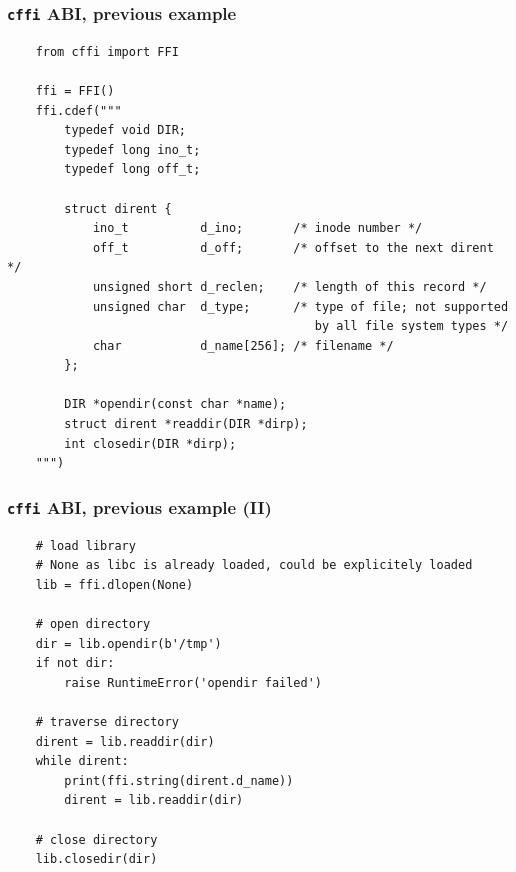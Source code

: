 \documentclass[handout]{beamer}
\begin{document}
\begin{frame}[fragile]
  \frametitle{\texttt{cffi} ABI, previous example}

  \begin{verbatim}
    from cffi import FFI

    ffi = FFI()
    ffi.cdef("""
        typedef void DIR;
        typedef long ino_t;
        typedef long off_t;

        struct dirent {
            ino_t          d_ino;       /* inode number */
            off_t          d_off;       /* offset to the next dirent */
            unsigned short d_reclen;    /* length of this record */
            unsigned char  d_type;      /* type of file; not supported
                                           by all file system types */
            char           d_name[256]; /* filename */
        };

        DIR *opendir(const char *name);
        struct dirent *readdir(DIR *dirp);
        int closedir(DIR *dirp);
    """)
  \end{verbatim}
\end{frame}

\begin{frame}[fragile]
  \frametitle{\texttt{cffi} ABI, previous example (II)}

  \begin{verbatim}
    # load library
    # None as libc is already loaded, could be explicitely loaded
    lib = ffi.dlopen(None)

    # open directory
    dir = lib.opendir(b'/tmp')
    if not dir:
        raise RuntimeError('opendir failed')

    # traverse directory
    dirent = lib.readdir(dir)
    while dirent:
        print(ffi.string(dirent.d_name))
        dirent = lib.readdir(dir)

    # close directory
    lib.closedir(dir)
  \end{verbatim}
\end{frame}
\end{document}
